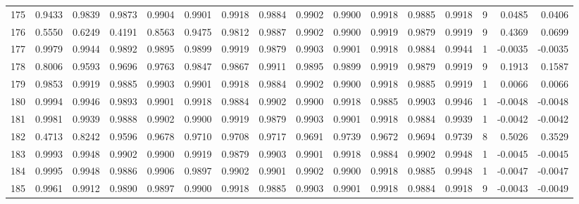 \begin{tabular}{lrrrrrrrrrrrrrrr}
175 &      0.9433 &  0.9839 &  0.9873 &  0.9904 &  0.9901 &  0.9918 &  0.9884 &  0.9902 &  0.9900 &  0.9918 &   0.9885 &     0.9918 &      9 &                    0.0485 &                     0.0406 \\
176 &      0.5550 &  0.6249 &  0.4191 &  0.8563 &  0.9475 &  0.9812 &  0.9887 &  0.9902 &  0.9900 &  0.9919 &   0.9879 &     0.9919 &      9 &                    0.4369 &                     0.0699 \\
177 &      0.9979 &  0.9944 &  0.9892 &  0.9895 &  0.9899 &  0.9919 &  0.9879 &  0.9903 &  0.9901 &  0.9918 &   0.9884 &     0.9944 &      1 &                   -0.0035 &                    -0.0035 \\
178 &      0.8006 &  0.9593 &  0.9696 &  0.9763 &  0.9847 &  0.9867 &  0.9911 &  0.9895 &  0.9899 &  0.9919 &   0.9879 &     0.9919 &      9 &                    0.1913 &                     0.1587 \\
179 &      0.9853 &  0.9919 &  0.9885 &  0.9903 &  0.9901 &  0.9918 &  0.9884 &  0.9902 &  0.9900 &  0.9918 &   0.9885 &     0.9919 &      1 &                    0.0066 &                     0.0066 \\
180 &      0.9994 &  0.9946 &  0.9893 &  0.9901 &  0.9918 &  0.9884 &  0.9902 &  0.9900 &  0.9918 &  0.9885 &   0.9903 &     0.9946 &      1 &                   -0.0048 &                    -0.0048 \\
181 &      0.9981 &  0.9939 &  0.9888 &  0.9902 &  0.9900 &  0.9919 &  0.9879 &  0.9903 &  0.9901 &  0.9918 &   0.9884 &     0.9939 &      1 &                   -0.0042 &                    -0.0042 \\
182 &      0.4713 &  0.8242 &  0.9596 &  0.9678 &  0.9710 &  0.9708 &  0.9717 &  0.9691 &  0.9739 &  0.9672 &   0.9694 &     0.9739 &      8 &                    0.5026 &                     0.3529 \\
183 &      0.9993 &  0.9948 &  0.9902 &  0.9900 &  0.9919 &  0.9879 &  0.9903 &  0.9901 &  0.9918 &  0.9884 &   0.9902 &     0.9948 &      1 &                   -0.0045 &                    -0.0045 \\
184 &      0.9995 &  0.9948 &  0.9886 &  0.9906 &  0.9897 &  0.9902 &  0.9901 &  0.9902 &  0.9900 &  0.9918 &   0.9885 &     0.9948 &      1 &                   -0.0047 &                    -0.0047 \\
185 &      0.9961 &  0.9912 &  0.9890 &  0.9897 &  0.9900 &  0.9918 &  0.9885 &  0.9903 &  0.9901 &  0.9918 &   0.9884 &     0.9918 &      9 &                   -0.0043 &                    -0.0049 \\

\end{tabular}
